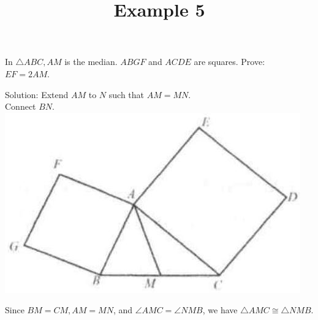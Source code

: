\documentclass{article}
\title{Example 5}
\date{}
\begin{document}
\maketitle

In \(\triangle A B C, A M\) is the median. \(A B G F\) and \(A C D E\) are squares. Prove:\\
\(E F=2 A M\).

Solution:
Extend \(A M\) to \(N\) such that \(A M=M N\).\\
Connect \(B N\).\\
\centering
\includegraphics[width=\textwidth]{images/problem_image_1.jpg}

Since \(B M=C M, A M=M N\), and \(\angle A M C=\angle N M B\), we have \(\triangle A M C \cong \triangle N M B\).
\end{document}
